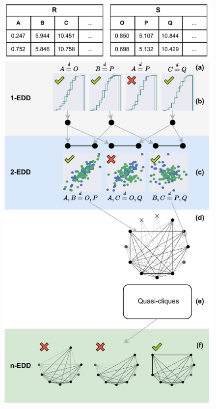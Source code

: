 \documentclass[10pt]{beamer}
\begin{document}
\begin{frame}{}
\begin{figure}
    \centering
    \includegraphics[height=\textheight]{pipeline.pdf}
\end{figure}
\end{frame}
\end{document}
